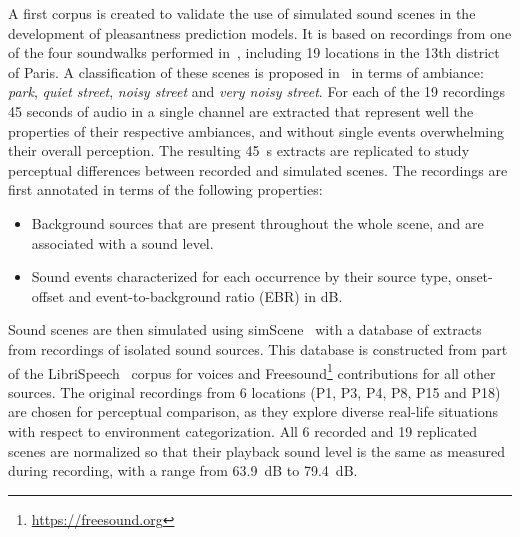 \documentclass[11pt,a4paper]{article}
\begin{document}
A first corpus is created to validate the use of simulated sound scenes in the development of pleasantness prediction models. It is based on recordings from one of the four soundwalks performed in~\cite{aumond2017}, including 19 locations in the 13th district of Paris. A classification of these scenes is proposed in~\cite{gloaguen2017} in terms of ambiance: \textit{park}, \textit{quiet street}, \textit{noisy street} and \textit{very noisy street}. For each of the 19 recordings 45 seconds of audio in a single channel are extracted that represent well the properties of their respective ambiances, and without single events overwhelming their overall perception. The resulting 45~s extracts are replicated to study perceptual differences between recorded and simulated scenes. The recordings are first annotated in terms of the following properties:

\begin{itemize}
\item Background sources that are present throughout the whole scene, and are associated with a sound level.
\item Sound events characterized for each occurrence by their source type, onset-offset and event-to-background ratio (EBR) in dB.
\end{itemize}

Sound scenes are then simulated using simScene~\cite{rossignol2015} with a database of extracts from recordings of isolated sound sources. This database is constructed from part of the LibriSpeech~\cite{panayotov2015} corpus for voices and Freesound\footnote{\url{https://freesound.org}} contributions for all other sources. The original recordings from 6 locations (P1, P3, P4, P8, P15 and P18) are chosen for perceptual comparison, as they explore diverse real-life situations with respect to environment categorization. All 6 recorded and 19 replicated scenes are normalized so that their playback sound level is the same as measured during recording, with a range from 63.9~dB to 79.4~dB.\\
\end{document}
